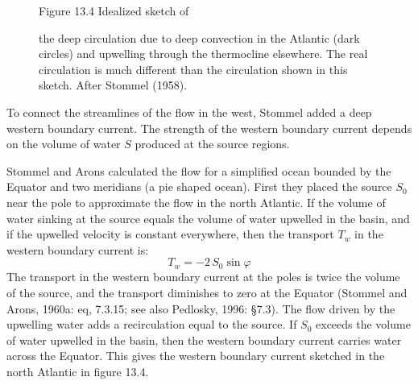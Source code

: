 \begin{figure}[t!]
{}
\footnotesize
Figure 13.4 Idealized sketch of \rule{0mm}{4ex}the deep circulation
due to deep convection in the Atlantic (dark circles) and
upwelling through the
thermocline elsewhere. The
real circulation is much different than the circulation shown in this
sketch. After Stommel (1958).

\label{fig:stommeldeep}
\vspace{-3ex}
\end{figure}

To connect the streamlines of the flow in the west, Stommel added a
deep western boundary current. The strength of the western boundary
current depends on the volume of water $S$ produced at the source
regions.

Stommel and Arons calculated the flow for a simplified ocean bounded
by the Equator and two meridians (a pie shaped ocean). First they
placed the source $S_0$ near the pole to approximate the flow in the
north Atlantic. If the volume of water sinking at the source equals
the volume of water upwelled in the basin, and if the upwelled
velocity is constant everywhere, then the transport $T_w$ in the western boundary current is:
\begin{equation}
T_w = -2\,S_0 \sin \varphi
\end{equation}
The transport in the western boundary current at the poles is twice
the volume of the source, and the transport diminishes to zero at the
Equator (Stommel and Arons, 1960a: eq, 7.3.15; see also Pedlosky,
1996: \S 7.3). The flow driven by the upwelling water adds a recirculation equal to the source. If
$S_0$ exceeds the volume of water upwelled in the basin, then the
western boundary current carries water across the Equator. This gives
the western boundary current sketched in the north Atlantic in figure
13.4.

